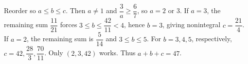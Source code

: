 Reorder so $a\le b\le c$. Then $a\ne1$ and $\dfrac{3}{a}\ge\dfrac{6}{7}$, so $a=2$ or $3$. If $a=3$, the remaining sum $\dfrac{11}{21}$ forces $3\le b\le\dfrac{42}{11}<4$, hence $b=3$, giving nonintegral $c=\dfrac{21}{4}$. If $a=2$, the remaining sum is $\dfrac{5}{14}$ and $3\le b\le5$. For $b=3,4,5$, respectively, $c=42,\dfrac{28}{3},\dfrac{70}{11}$. Only $(2,3,42)$ works. Thus $\boxed{a+b+c=47}$.
